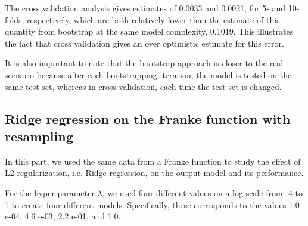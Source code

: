 \documentclass{article}
\begin{document}
The cross validation analysis gives estimates of 0.0033 and 0.0021, for 5- and 10-folds, respectively, which are both relatively lower than the estimate of this quantity from bootstrap at the same model complexity, 0.1019. This illustrates the fact that cross validation gives an over optimistic estimate for this error.

It is also important to note that the bootstrap approach is closer to the real scenario because after each bootstrapping iteration, the model is tested on the same test set, whereas in cross validation, each time the test set is changed.

\clearpage
\subsection{Ridge regression on the Franke function with resampling}
In this part, we used the same data from a Franke function to study the effect of L2 regularization, i.e. Ridge regression, on the output model and its performance.

For the hyper-parameter $\lambda$, we used four different values on a log-scale from -4 to 1 to create four different models. Specifically, these corresponds to the values 1.0 e-04, 4.6 e-03, 2.2 e-01, and 1.0.
\end{document}
